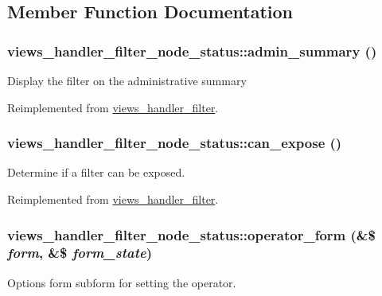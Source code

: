 \subsection{Member Function Documentation}
\hypertarget{classviews__handler__filter__node__status_afad09e6f2c94d8f6748b48c3ce137a25}{
\subsubsection[{admin\_\-summary}]{\setlength{\rightskip}{0pt plus 5cm}views\_\-handler\_\-filter\_\-node\_\-status::admin\_\-summary ()}}
\label{classviews__handler__filter__node__status_afad09e6f2c94d8f6748b48c3ce137a25}
Display the filter on the administrative summary 

Reimplemented from \hyperlink{classviews__handler__filter_a655263cd0b73188eec064b9a9743fe4c}{views\_\-handler\_\-filter}.\hypertarget{classviews__handler__filter__node__status_adaece4fdfbc098bb12b83a7cae193cc3}{
\subsubsection[{can\_\-expose}]{\setlength{\rightskip}{0pt plus 5cm}views\_\-handler\_\-filter\_\-node\_\-status::can\_\-expose ()}}
\label{classviews__handler__filter__node__status_adaece4fdfbc098bb12b83a7cae193cc3}
Determine if a filter can be exposed. 

Reimplemented from \hyperlink{classviews__handler__filter_af0e5810a2a2f194cd6af0fca9c858756}{views\_\-handler\_\-filter}.\hypertarget{classviews__handler__filter__node__status_a667b6e76f34a6665898585ae13cb2842}{
\subsubsection[{operator\_\-form}]{\setlength{\rightskip}{0pt plus 5cm}views\_\-handler\_\-filter\_\-node\_\-status::operator\_\-form (\&\$ {\em form}, \/  \&\$ {\em form\_\-state})}}
\label{classviews__handler__filter__node__status_a667b6e76f34a6665898585ae13cb2842}
Options form subform for setting the operator.

